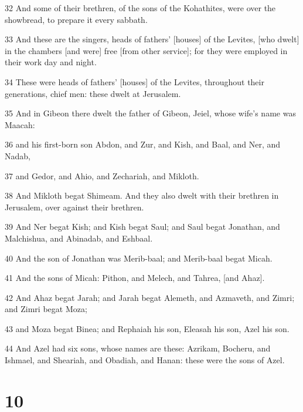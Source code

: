 \par 32 And some of their brethren, of the sons of the Kohathites, were over the showbread, to prepare it every sabbath.
\par 33 And these are the singers, heads of fathers' [houses] of the Levites, [who dwelt] in the chambers [and were] free [from other service]; for they were employed in their work day and night.
\par 34 These were heads of fathers' [houses] of the Levites, throughout their generations, chief men: these dwelt at Jerusalem.
\par 35 And in Gibeon there dwelt the father of Gibeon, Jeiel, whose wife's name was Maacah:
\par 36 and his first-born son Abdon, and Zur, and Kish, and Baal, and Ner, and Nadab,
\par 37 and Gedor, and Ahio, and Zechariah, and Mikloth.
\par 38 And Mikloth begat Shimeam. And they also dwelt with their brethren in Jerusalem, over against their brethren.
\par 39 And Ner begat Kish; and Kish begat Saul; and Saul begat Jonathan, and Malchishua, and Abinadab, and Eshbaal.
\par 40 And the son of Jonathan was Merib-baal; and Merib-baal begat Micah.
\par 41 And the sons of Micah: Pithon, and Melech, and Tahrea, [and Ahaz].
\par 42 And Ahaz begat Jarah; and Jarah begat Alemeth, and Azmaveth, and Zimri; and Zimri begat Moza;
\par 43 and Moza begat Binea; and Rephaiah his son, Eleasah his son, Azel his son.
\par 44 And Azel had six sons, whose names are these: Azrikam, Bocheru, and Ishmael, and Sheariah, and Obadiah, and Hanan: these were the sons of Azel.

\chapter{10}

